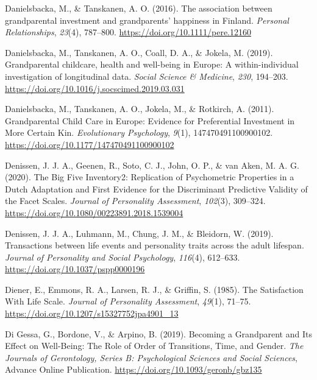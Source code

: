 \documentclass[
  english,
  man, noextraspace]{apa7}
\begin{document}
\leavevmode\hypertarget{ref-danielsbackaAssociationGrandparentalInvestment2016}{}%
Danielsbacka, M., \& Tanskanen, A. O. (2016). The association between grandparental investment and grandparents' happiness in Finland. \emph{Personal Relationships}, \emph{23}(4), 787--800. \url{https://doi.org/10.1111/pere.12160}

\leavevmode\hypertarget{ref-danielsbackaGrandparentalChildcareHealth2019}{}%
Danielsbacka, M., Tanskanen, A. O., Coall, D. A., \& Jokela, M. (2019). Grandparental childcare, health and well-being in Europe: A within-individual investigation of longitudinal data. \emph{Social Science \& Medicine}, \emph{230}, 194--203. \url{https://doi.org/10.1016/j.socscimed.2019.03.031}

\leavevmode\hypertarget{ref-danielsbackaGrandparentalChildCare2011}{}%
Danielsbacka, M., Tanskanen, A. O., Jokela, M., \& Rotkirch, A. (2011). Grandparental Child Care in Europe: Evidence for Preferential Investment in More Certain Kin. \emph{Evolutionary Psychology}, \emph{9}(1), 147470491100900102. \url{https://doi.org/10.1177/147470491100900102}

\leavevmode\hypertarget{ref-denissenBigFiveInventory2020}{}%
Denissen, J. J. A., Geenen, R., Soto, C. J., John, O. P., \& van Aken, M. A. G. (2020). The Big Five Inventory2: Replication of Psychometric Properties in a Dutch Adaptation and First Evidence for the Discriminant Predictive Validity of the Facet Scales. \emph{Journal of Personality Assessment}, \emph{102}(3), 309--324. \url{https://doi.org/10.1080/00223891.2018.1539004}

\leavevmode\hypertarget{ref-denissenTransactionsLifeEvents2019}{}%
Denissen, J. J. A., Luhmann, M., Chung, J. M., \& Bleidorn, W. (2019). Transactions between life events and personality traits across the adult lifespan. \emph{Journal of Personality and Social Psychology}, \emph{116}(4), 612--633. \url{https://doi.org/10.1037/pspp0000196}

\leavevmode\hypertarget{ref-dienerSatisfactionLifeScale1985}{}%
Diener, E., Emmons, R. A., Larsen, R. J., \& Griffin, S. (1985). The Satisfaction With Life Scale. \emph{Journal of Personality Assessment}, \emph{49}(1), 71--75. \url{https://doi.org/10.1207/s15327752jpa4901_13}

\leavevmode\hypertarget{ref-digessaBecomingGrandparentIts2019}{}%
Di Gessa, G., Bordone, V., \& Arpino, B. (2019). Becoming a Grandparent and Its Effect on Well-Being: The Role of Order of Transitions, Time, and Gender. \emph{The Journals of Gerontology, Series B: Psychological Sciences and Social Sciences}, Advance Online Publication. \url{https://doi.org/10.1093/geronb/gbz135}
\end{document}
